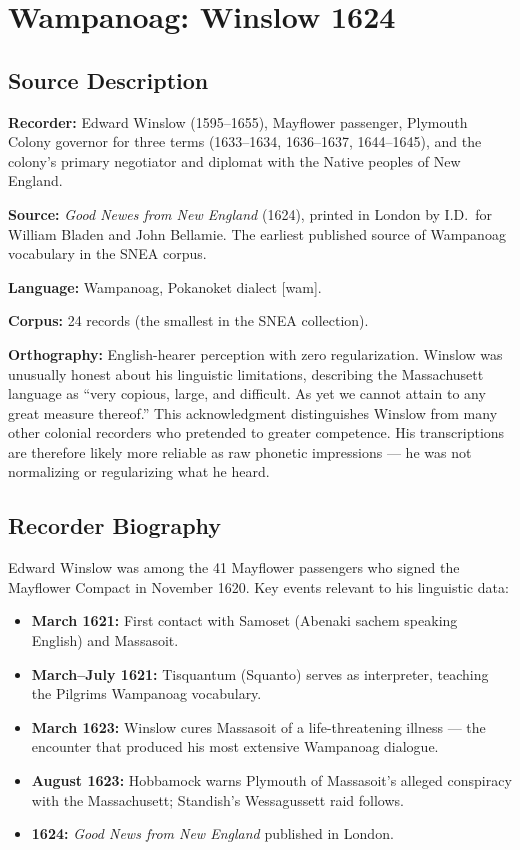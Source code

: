 
\section{Wampanoag: Winslow 1624}
\label{sec:1366}

\subsection{Source Description}

\textbf{Recorder:} Edward Winslow (1595--1655), Mayflower passenger, Plymouth
Colony governor for three terms (1633--1634, 1636--1637, 1644--1645), and the
colony's primary negotiator and diplomat with the Native peoples of New England.

\textbf{Source:} \emph{Good Newes from New England} (1624), printed in London by
I.D.\ for William Bladen and John Bellamie. The earliest published source of
Wampanoag vocabulary in the SNEA corpus.

\textbf{Language:} Wampanoag, Pokanoket dialect [wam].

\textbf{Corpus:} 24 records (the smallest in the SNEA collection).

\textbf{Orthography:} English-hearer perception with zero regularization.
Winslow was unusually honest about his linguistic limitations, describing the
Massachusett language as ``very copious, large, and difficult. As yet we cannot
attain to any great measure thereof.'' This acknowledgment distinguishes
Winslow from many other colonial recorders who pretended to greater competence.
His transcriptions are therefore likely more reliable as raw phonetic
impressions --- he was not normalizing or regularizing what he heard.

\subsection{Recorder Biography}

Edward Winslow was among the 41 Mayflower passengers who signed the Mayflower
Compact in November 1620. Key events relevant to his linguistic data:

\begin{itemize}
  \item \textbf{March 1621:} First contact with Samoset (Abenaki sachem speaking
    English) and Massasoit.
  \item \textbf{March--July 1621:} Tisquantum (Squanto) serves as interpreter,
    teaching the Pilgrims Wampanoag vocabulary.
  \item \textbf{March 1623:} Winslow cures Massasoit of a life-threatening
    illness --- the encounter that produced his most extensive Wampanoag
    dialogue.
  \item \textbf{August 1623:} Hobbamock warns Plymouth of Massasoit's alleged
    conspiracy with the Massachusett; Standish's Wessagussett raid follows.
  \item \textbf{1624:} \emph{Good News from New England} published in London.
\end{itemize}

